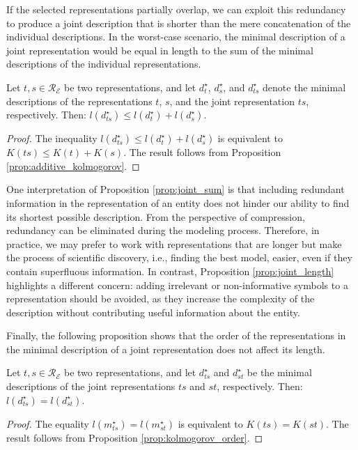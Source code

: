 If the selected representations partially overlap, we can exploit this redundancy to produce a joint description that is shorter than the mere concatenation of the individual descriptions. In the worst-case scenario, the minimal description of a joint representation would be equal in length to the sum of the minimal descriptions of the individual representations.

\begin{proposition}
\label{prop:joint_sum}
Let $t, s \in \mathcal{R}_\mathcal{E}$ be two representations, and let $d_{t}^{\star}$, $d_{s}^{\star}$, and $d_{ts}^{\star}$ denote the minimal descriptions of the representations $t$, $s$, and the joint representation $ts$, respectively. Then: $l \left( d_{ts}^{\star} \right) \leq l \left( d_{t}^{\star} \right) + l \left( d_{s}^{\star} \right).$
\end{proposition}
\begin{proof}
The inequality $l \left( d_{ts}^{\star} \right) \leq l \left( d_{t}^{\star} \right) + l \left( d_{s}^{\star} \right)$ is equivalent to $K(ts) \leq K(t) + K(s)$. The result follows from Proposition \ref{prop:additive_kolmogorov}.
\end{proof}

One interpretation of Proposition \ref{prop:joint_sum} is that including redundant information in the representation of an entity does not hinder our ability to find its shortest possible description. From the perspective of compression, redundancy can be eliminated during the modeling process. Therefore, in practice, we may prefer to work with representations that are longer but make the process of scientific discovery, i.e., finding the best model, easier, even if they contain superfluous information. In contrast, Proposition \ref{prop:joint_length} highlights a different concern: adding irrelevant or non-informative symbols to a representation should be avoided, as they increase the complexity of the description without contributing useful information about the entity.

Finally, the following proposition shows that the order of the representations in the minimal description of a joint representation does not affect its length.

\begin{proposition}
\label{prop:joint_order}
Let $t, s \in \mathcal{R}_\mathcal{E}$ be two representations, and let $d_{ts}^{\star}$ and $d_{st}^{\star}$ be the minimal descriptions of the joint representations $ts$ and $st$, respectively. Then: $l \left( d_{ts}^{\star} \right) = l \left( d_{st}^{\star} \right).$
\end{proposition}
\begin{proof}
The equality $l \left( m_{ts}^{\star} \right) = l \left( m_{st}^{\star} \right)$ is equivalent to $K(ts) = K(st)$. The result follows from Proposition \ref{prop:kolmogorov_order}.
\end{proof}

